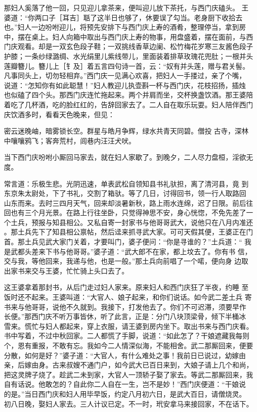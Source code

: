 那妇人奚落了他一回，只见迎儿拿茶来，便叫迎儿放下茶托，与西门庆磕头。
王婆道：“你两口子［耳吉］聒了这半日也够了，休要误了勾当。老身厨下收拾去
也。”妇人一边吩咐迎儿，将预先安排下与西门庆上寿的酒肴，整理停当，拿到房
中，摆在桌上。妇人向箱中取出与西门庆上寿的物事，用盘盛着，摆在面前，与西
门庆观看。却是一双玄色段子鞋；一双挑线香草边阑、松竹梅花岁寒三友酱色段子
护膝；一条纱绿潞绸、水光绢里儿紫线带儿，里面装着排草玫瑰花兜肚；一根并头
莲瓣簪儿。簪儿上［钅及］着五言四句诗一首，云：“奴有并头莲，赠与君关髻。
凡事同头上，切勿轻相弃。”西门庆一见满心欢喜，把妇人一手搂过，亲了个嘴，
说道：“怎知你有如此聪慧！”妇人教迎儿执壶斟一杯与西门庆，花枝招扬，插烛
也似磕了四个头。那西门庆连忙拖起来。两个并肩而坐，交杯换盏饮酒。那王婆陪
着吃了几杯酒，吃的脸红红的，告辞回家去了。二人自在取乐玩耍。妇人陪伴西门
庆饮酒多时，看看天色晚来，但见：

密云迷晚岫，暗雾锁长空。群星与皓月争辉，绿水共青天同碧。僧投
古寺，深林中嚷嚷鸦飞；客奔荒村，闾巷内汪汪犬吠。

当下西门庆吩咐小厮回马家去，就在妇人家歇了。到晚夕，二人尽力盘桓，淫欲无
度。

常言道：乐极生悲。光阴迅速，单表武松自领知县书礼驮担，离了清河县，竟
到东京朱太尉处，下了书礼，交割了箱驮。等了几日，讨得回书，领一行人取路回
山东而来。去时三四月天气，回来却淡暑新秋，路上雨水连绵，迟了日限。前后往
回也有三个月光景。在路上行往坐卧，只觉得神思不安，身心恍惚，不免先差了一
个土兵，预报与知县相公。又私自寄一封家书与他哥哥武大，说他只在八月内准还
。那土兵先下了知县相公禀帖，然后迳来抓寻武大家。可可天假其便，王婆正在门
首。那土兵见武大家门关着，才要叫门，婆子便问：“你是寻谁的？”土兵道：“
我是武都头差来下书与他哥哥。”婆子道：“武大郎不在家，都上坟去了。你有书
信，交与我，等他回来，我递与他，也是一般。”那土兵向前唱了一个喏，便向身
边取出家书来交与王婆，忙忙骑上头口去了。

这王婆拿着那封书，从后门走过妇人家来。原来妇人和西门庆狂了半夜，约睡
至饭时还不起来。王婆叫道：“大官人、娘子起来，和你们说话。如今武二差土兵
寄书来与他哥哥，说他不久就到。我接下，打发他去了。你们不可迟滞，须要早作
长便。”那西门庆不听万事皆休，听了此言，正是：分门八块顶梁骨，倾下半桶冰
雪来。慌忙与妇人都起来，穿上衣服，请王婆到房内坐下。取出书来与西门庆看。
书中写着，不过中秋回家。二人都慌了手脚，说道：“如此怎了？干娘遮藏我每则
个，恩有重报，不敢有忘。我如今二人情深似海，不能相舍。武二那厮回来，便要
分散，如何是好？”婆子道：“大官人，有什么难处之事！我前日已说过，幼嫁由
亲，后嫁由身。古来叔嫂不通门户，如今武大已百日来到，大娘子请上几个和尚，
把这灵牌子烧了。趁武二未到家，大官人一顶轿子娶了家去。等武二那厮回来，我
自有话说。他敢怎的？自此你二人自在一生，岂不是妙！”西门庆便道：“干娘说
的是。”当日西门庆和妇人用毕早饭，约定八月初六日，是武大百日，请僧烧灵。
初八日晚，娶妇人家去。三人计议已定。不一时，玳安拿马来接回家，不在话下。

